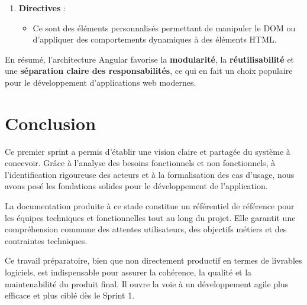 \begin{enumerate}
    \item \textbf{Directives} :
    \begin{itemize}
        \item Ce sont des éléments personnalisés permettant de manipuler le DOM ou d’appliquer des comportements dynamiques à des éléments HTML.
    \end{itemize}
\end{enumerate}

\medskip

\noindent
En résumé, l’architecture Angular favorise la \textbf{modularité}, la \textbf{réutilisabilité} et une \textbf{séparation claire des responsabilités}, ce qui en fait un choix populaire pour le développement d’applications web modernes.

\section*{Conclusion}

Ce premier sprint a permis d'établir une vision claire et partagée du système à concevoir. Grâce à l'analyse des besoins fonctionnels et non fonctionnels, à l’identification rigoureuse des acteurs et à la formalisation des cas d’usage, nous avons posé les fondations solides pour le développement de l’application.

La documentation produite à ce stade constitue un référentiel de référence pour les équipes techniques et fonctionnelles tout au long du projet. Elle garantit une compréhension commune des attentes utilisateurs, des objectifs métiers et des contraintes techniques.

Ce travail préparatoire, bien que non directement productif en termes de livrables logiciels, est indispensable pour assurer la cohérence, la qualité et la maintenabilité du produit final. Il ouvre la voie à un développement agile plus efficace et plus ciblé dès le Sprint 1.
